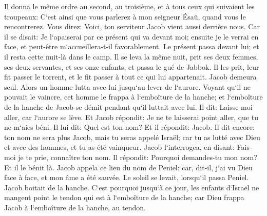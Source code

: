 \verse Il donna le même ordre au second, au troisième, et à tous ceux qui suivaient les troupeaux: C`est ainsi que vous parlerez à mon seigneur Ésaü, quand vous le rencontrerez. 
\verse Vous direz: Voici, ton serviteur Jacob vient aussi derrière nous. Car il se disait: Je l`apaiserai par ce présent qui va devant moi; ensuite je le verrai en face, et peut-être m`accueillera-t-il favorablement. 
\verse Le présent passa devant lui; et il resta cette nuit-là dans le camp. 
\verse Il se leva la même nuit, prit ses deux femmes, ses deux servantes, et ses onze enfants, et passa le gué de Jabbok. 
\verse Il les prit, leur fit passer le torrent, et le fit passer à tout ce qui lui appartenait. 
\verse Jacob demeura seul. Alors un homme lutta avec lui jusqu`au lever de l`aurore. 
\verse Voyant qu`il ne pouvait le vaincre, cet homme le frappa à l`emboîture de la hanche; et l`emboîture de la hanche de Jacob se démit pendant qu`il luttait avec lui. 
\verse Il dit: Laisse-moi aller, car l`aurore se lève. Et Jacob répondit: Je ne te laisserai point aller, que tu ne m`aies béni. 
\verse Il lui dit: Quel est ton nom? Et il répondit: Jacob. 
\verse Il dit encore: ton nom ne sera plus Jacob, mais tu seras appelé Israël; car tu as lutté avec Dieu et avec des hommes, et tu as été vainqueur. 
\verse Jacob l`interrogea, en disant: Fais-moi je te prie, connaître ton nom. Il répondit: Pourquoi demandes-tu mon nom? Et il le bénit là. 
\verse Jacob appela ce lieu du nom de Peniel: car, dit-il, j`ai vu Dieu face à face, et mon âme a été sauvée. 
\verse Le soleil se levait, lorsqu`il passa Peniel. Jacob boitait de la hanche. 
\verse C`est pourquoi jusqu`à ce jour, les enfants d`Israël ne mangent point le tendon qui est à l`emboîture de la hanche; car Dieu frappa Jacob à l`emboîture de la hanche, au tendon. 

